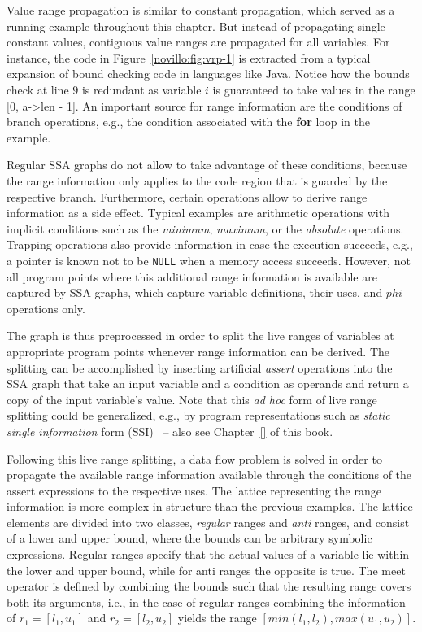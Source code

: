 Value range propagation is similar to constant propagation, which served as a
running example throughout this chapter. But instead of propagating single
constant values, contiguous value ranges are propagated for all variables. For
instance, the code in Figure~\ref{novillo:fig:vrp-1} is extracted from a
typical expansion of bound checking code in languages like Java. Notice how the
bounds check at line $9$ is redundant as variable $i$ is guaranteed to take
values in the range [$0$, a-\textgreater len - 1]. An important source for range
information are the conditions of branch operations, e.g., the condition
associated with the \textbf{for} loop in the example.

Regular SSA graphs do not allow to take advantage of these conditions, because
the range information only applies to the code region that is guarded by the
respective branch. Furthermore, certain operations allow to derive range
information as a side effect. Typical examples are arithmetic operations with
implicit conditions such as the \emph{minimum}, \emph{maximum}, or the
\emph{absolute} operations. Trapping operations also provide information in case
the execution succeeds, e.g., a pointer is known not to be \texttt{NULL} when a
memory access succeeds. However, not all program points where this additional
range information is available are captured by SSA graphs, which capture
variable definitions, their uses, and $phi$-operations only.

The graph is thus preprocessed in order to split the live ranges of variables
at appropriate program points whenever range information can be derived. The
splitting can be accomplished by inserting artificial \emph{assert} operations
into the SSA graph that take an input variable and a condition as operands and
return a copy of the input variable's value. Note that this \emph{ad hoc} form
of live range splitting could be generalized, e.g., by program representations
such as \emph{static single information} form
(SSI)~\cite{novillo:bib:A99,novillo:bib:S05} -- also see Chapter~\ref{} of this
book. 

Following this live range splitting, a data flow problem is solved in order to
propagate the available range information available through the conditions of
the assert expressions to the respective uses. The lattice representing the
range information is more complex in structure than the previous examples. The
lattice elements are divided into two classes, \emph{regular} ranges and
\emph{anti} ranges, and consist of a lower and upper bound, where the bounds can
be arbitrary symbolic expressions. Regular ranges specify that the actual values
of a variable lie within the lower and upper bound, while for anti ranges the
opposite is true. The meet operator is defined by combining the bounds such that
the resulting range covers both its arguments, i.e., in the case of regular
ranges combining the information of $r_1 = [l_1, u_1]$ and $r_2 = [l_2, u_2]$
yields the range $[min(l_1, l_2), max(u_1, u_2)]$.

